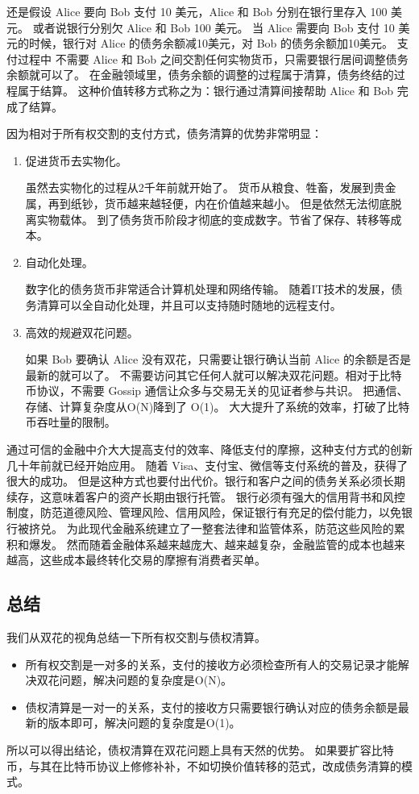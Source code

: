 还是假设 Alice 要向 Bob 支付 10 美元，Alice 和 Bob 分别在银行里存入 100 美元。
或者说银行分别欠 Alice 和 Bob 100 美元。
当 Alice 需要向 Bob 支付 10 美元的时候，银行对 Alice 的债务余额减10美元，对 Bob 的债务余额加10美元。
支付过程中 不需要 Alice 和 Bob 之间交割任何实物货币，只需要银行居间调整债务余额就可以了。
在金融领域里，债务余额的调整的过程属于清算，债务终结的过程属于结算。
这种价值转移方式称之为：银行通过清算间接帮助 Alice 和 Bob 完成了结算。

因为相对于所有权交割的支付方式，债务清算的优势非常明显：

\begin{enumerate}
    \item 促进货币去实物化。
    
    虽然去实物化的过程从2千年前就开始了。
    货币从粮食、牲畜，发展到贵金属，再到纸钞，货币越来越轻便，内在价值越来越小。
    但是依然无法彻底脱离实物载体。
    到了债务货币阶段才彻底的变成数字。节省了保存、转移等成本。
    
    \item 自动化处理。
    
    数字化的债务货币非常适合计算机处理和网络传输。
    随着IT技术的发展，债务清算可以全自动化处理，并且可以支持随时随地的远程支付。
    
    \item 高效的规避双花问题。
    
    如果 Bob 要确认 Alice 没有双花，只需要让银行确认当前 Alice 的余额是否是最新的就可以了。
    不需要访问其它任何人就可以解决双花问题。相对于比特币协议，不需要 Gossip 通信让众多与交易无关的见证者参与共识。
    把通信、存储、计算复杂度从O(N)降到了 O(1)。
    大大提升了系统的效率，打破了比特币吞吐量的限制。
    
\end{enumerate}

通过可信的金融中介大大提高支付的效率、降低支付的摩擦，这种支付方式的创新几十年前就已经开始应用。
随着 Visa、支付宝、微信等支付系统的普及，获得了很大的成功。
但是这种方式也要付出代价。银行和客户之间的债务关系必须长期续存，这意味着客户的资产长期由银行托管。
银行必须有强大的信用背书和风控制度，防范道德风险、管理风险、信用风险，保证银行有充足的偿付能力，以免银行被挤兑。
为此现代金融系统建立了一整套法律和监管体系，防范这些风险的累积和爆发。
然而随着金融体系越来越庞大、越来越复杂，金融监管的成本也越来越高，这些成本最终转化交易的摩擦有消费者买单。

\subsection{总结}
我们从双花的视角总结一下所有权交割与债权清算。

\begin{itemize}
    \item 所有权交割是一对多的关系，支付的接收方必须检查所有人的交易记录才能解决双花问题，解决问题的复杂度是O(N)。
    \item 债权清算是一对一的关系，支付的接收方只需要银行确认对应的债务余额是最新的版本即可，解决问题的复杂度是O(1)。
\end{itemize}

所以可以得出结论，债权清算在双花问题上具有天然的优势。
如果要扩容比特币，与其在比特币协议上修修补补，不如切换价值转移的范式，改成债务清算的模式。
